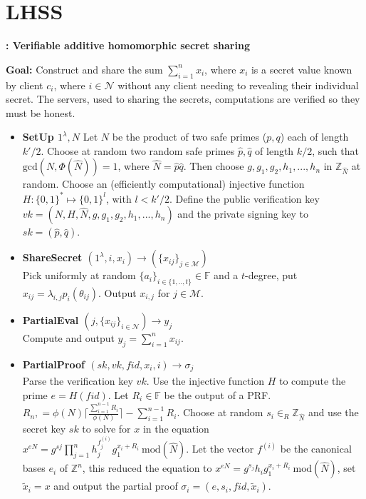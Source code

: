 \chapter{LHSS}
\label{appendix:VHASS-LSS}

\begin{algorithm}
\caption{\textbf{: Verifiable additive homomorphic secret sharing}}
\textbf{Goal:} Construct and share the sum $\sum_{i=1}^n x_i$, where $x_i$ is a secret value known by client $c_i$, where $i\in\mathcal{N}$ without any client needing to revealing their individual secret. The servers, used to sharing the secrets, computations are verified so they must be honest. 
\vspace{2pt}
\hline
\vspace{2pt}
\begin{itemize}
    \item\textbf{SetUp $1^\lambda, N$}
    Let $N$ be the product of two safe primes ($p,q$)  each of length $k'/2$. Choose at random two random safe primes $\hat{p},\hat{q}$ of length $k/2$, such that $\text{gcd}(N,\Phi(\hat{N}))=1$, where $\hat{N}=\hat{p}\hat{q}$. Then choose $g,g_1,g_2,h_1,...,h_n$ in $\mathds{Z}_{\hat{N}}$ at random. Choose an (efficiently computational) injective function $H:\{0,1\}^* \mapsto \{0,1\}^l$, with $l<k'/2$. Define the public verification key $vk= (N,H,\hat{N},g,g_1,g_2,h_1,...,h_n)$ and the private signing key to $sk=(\hat{p},\hat{q})$. 
  \item\textbf{ShareSecret $(1^\lambda,i,x_i)\xrightarrow[]{}(\{x_{ij}\}_{j\in\mathcal{M}})$}\\
Pick uniformly at random $\{a_i\}_{i\in\{1,..,t\}}\in\mathds{F}$ and a $t$-degree, put $x_{ij}=\lambda_{i,j}p_i(\theta_{ij})$.  Output $x_{i,j}$ for $j\in\mathcal{M}$. 


\item\textbf{PartialEval $(j,\{x_{ij}\}_{i\in\mathcal{N}})\xrightarrow[]{}y_j$}\\
Compute and output $y_j = \sum_{i=1}^n x_{ij}$.

\item\textbf{PartialProof $(sk,vk,fid,x_i,i)\xrightarrow[]{}\sigma_j$}\\
Parse the verification key $vk$. Use the injective function $H$ to compute the prime $e=H(fid)$. Let $R_i\in\mathds{F}$ be the output of a PRF. $R_n, = \phi(N)\lceil \frac{\sum_{i=1}^{n-1}R_i}{\phi(N)}\rceil- \sum_{i=1}^{n-1}R_i $.  Choose at random $s_i\in_R\mathds{Z}_\hat{N}$ and use the secret key $sk$ to solve for $x$ in the equation $x^{eN}= g^{sj}\prod_{j=1}^n h_j^{f_j^{(i)}}g_1^{x_i+R_i} \: \text{mod}(\hat{N})$. Let the vector $f^{(i)}$ be the canonical bases $e_i$ of $\mathds{Z}^n$, this reduced the equation to $x^{eN}= g^{s_j} h_i g_1^{x_i+R_i} \: \text{mod}(\hat{N})$, set $\tilde{x}_i=x$ 
and output the partial proof $\sigma_i= (e,s_i,fid,\tilde{x}_i)$.


\end{itemize}
\end{algorithm}
